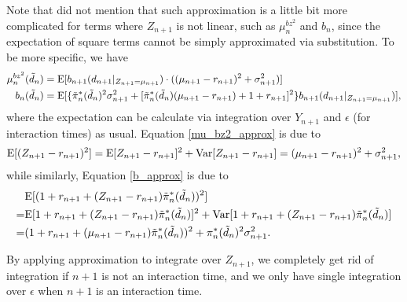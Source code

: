 Note that  did not mention that such approximation is a little bit more complicated for terms where $Z_{n+1}$ is not linear, such as $\mu_n^{bz^2}$ and $b_n$, since the expectation of square terms cannot be simply approximated via substitution. To be more specific, we have\begin{align}
    \mu_n^{bz^2}(\tilde d_n)&=\mathrm{E}[b_{n+1}(d_{n+1}|_{Z_{n+1}=\mu_{n+1}})\cdot ((\mu_{n+1}-r_{n+1})^2+\sigma_{n+1}^2)]\label{mu_bz2_approx}\\
    b_n(\tilde d_n)&=\mathrm{E}[\{\tilde\pi_n^*(\tilde d_n)^2\sigma_{n+1}^2+[\tilde\pi_n^*(\tilde d_n)(\mu_{n+1}-r_{n+1})+1+r_{n+1}]^2\}b_{n+1}(d_{n+1}|_{Z_{n+1}=\mu_{n+1}})]\label{b_approx},
\end{align} where the expectation can be calculate via integration over $Y_{n+1}$ and $\epsilon$ (for interaction times) as usual. Equation \eqref{mu_bz2_approx} is due to $$
    \begin{aligned}
        \mathrm{E}[(Z_{n+1}-r_{n+1})^2]=\mathrm{E}[Z_{n+1}-r_{n+1}]^2+\mathrm{Var}[Z_{n+1}-r_{n+1}]=(\mu_{n+1}-r_{n+1})^2+\sigma_{n+1}^2,
    \end{aligned}
$$ while similarly, Equation \eqref{b_approx} is due to $$
    \begin{aligned}
        &\mathrm{E}[(1+r_{n+1}+(Z_{n+1}-r_{n+1})\tilde\pi_n^*(\tilde d_n))^2]\\
        =&\mathrm{E}[1+r_{n+1}+(Z_{n+1}-r_{n+1})\tilde\pi_n^*(\tilde d_n)]^2+\mathrm{Var}[1+r_{n+1}+(Z_{n+1}-r_{n+1})\tilde\pi_n^*(\tilde d_n)]\\
        =&(1+r_{n+1}+(\mu_{n+1}-r_{n+1})\tilde\pi_n^*(\tilde d_n))^2+\pi_n^*(\tilde d_n)^2\sigma_{n+1}^2.
    \end{aligned}
$$

By applying approximation to integrate over $Z_{n+1}$, we completely get rid of integration if $n+1$ is not an interaction time, and we only have single integration over $\epsilon$ when $n+1$ is an interaction time.



